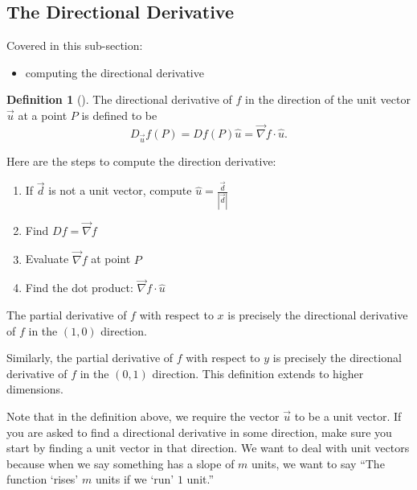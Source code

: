 \documentclass[10pt,]{book}
\theoremstyle{plain}
\theoremstyle{definition}
\newtheorem{definition}[theorem]{Definition}
\theoremstyle{definition}
\theoremstyle{definition}
\theoremstyle{definition}
\theoremstyle{definition}
\numberwithin{equation}{section}
\begin{document}
\subsection[{The Directional Derivative}]{The Directional Derivative}\label{subsection-33}
Covered in this sub-section: \leavevmode%
\begin{itemize}[label=\textbullet]
\item{}computing the directional derivative%
\end{itemize}
%
\begin{definition}[{}]\label{definition-38}
The directional derivative of \(f\) in the direction of the unit vector \(\vec u\) at a point \(P\) is defined to be%
\begin{equation*}
D_{\vec u} f(P) = Df(P) \hat u = \vec \nabla f \cdot \hat u.
\end{equation*}
%
\par
Here are the steps to compute the direction derivative: \leavevmode%
\begin{enumerate}
\item\hypertarget{li-158}{}If \(\vec{d}\) is not a unit vector, compute \(\hat{u}=\frac{\vec{d}}{|\vec{d}|}\)%
\item\hypertarget{li-159}{}Find \(Df=\vec{\nabla} f\)%
\item\hypertarget{li-160}{}Evaluate \(\vec{\nabla} f\) at point \(P\)%
\item\hypertarget{li-161}{}Find the dot product:  \(\vec \nabla f \cdot \hat u\)%
\end{enumerate}
%
\par
The partial derivative of \(f\) with respect to \(x\) is precisely the directional derivative of \(f\) in the \((1,0)\) direction.%
\par
Similarly, the partial derivative of \(f\) with respect to \(y\) is precisely the directional derivative of \(f\) in the \((0,1)\) direction. This definition extends to higher dimensions.%
\end{definition}
Note that in the definition above, we require the vector \(\vec u\) to be a unit vector. If you are asked to find a directional derivative in some direction, make sure you start by finding a unit vector in that direction. We want to deal with unit vectors because when we say something has a slope of \(m\) units, we want to say ``The function `rises' \(m\) units if we `run' \(1\) unit.''%
\end{document}

